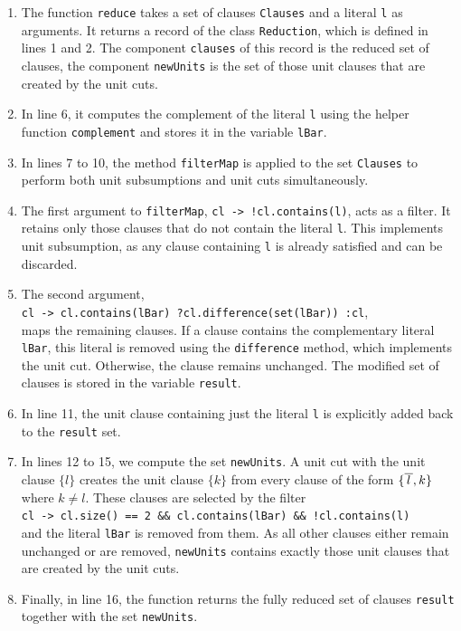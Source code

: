 \begin{enumerate}
\item The function \texttt{reduce} takes a set of clauses \texttt{Clauses} and a literal \texttt{l} as arguments.
  It returns a record of the class \texttt{Reduction}, which is defined in lines 1 and 2.  The component
  \texttt{clauses} of this record is the reduced set of clauses, the component \texttt{newUnits} is the set of
  those unit clauses that are created by the unit cuts.
\item In line 6, it computes the complement of the literal \texttt{l} using the helper function
  \texttt{complement} and stores it in the variable \texttt{lBar}.
\item In lines 7 to 10, the method \texttt{filterMap} is applied to the set \texttt{Clauses} to perform both
  unit subsumptions and unit cuts simultaneously.
\item The first argument to \texttt{filterMap}, \texttt{cl -> !cl.contains(l)}, acts as a filter. It retains only
  those clauses that do not contain the literal \texttt{l}. This implements unit subsumption, as any clause
  containing \texttt{l} is already satisfied and can be discarded. 
\item The second argument, 
  \\[0.2cm]
  \hspace*{1.3cm}
  \texttt{cl -> cl.contains(lBar) ?\;cl.difference(set(lBar)) :\;cl}, 
  \\[0.2cm]
  maps the remaining clauses. If a clause contains the complementary literal \texttt{lBar}, this literal is
  removed using the \texttt{difference} method, which implements the unit cut. Otherwise, the clause remains
  unchanged. The modified set of clauses is stored in the variable \texttt{result}. 
\item In line 11, the unit clause containing just the literal \texttt{l} is explicitly added back to the
  \texttt{result} set.
\item In lines 12 to 15, we compute the set \texttt{newUnits}.  A unit cut with the unit clause $\{l\}$ creates
  the unit clause $\{k\}$ from every clause of the form $\{\overline{\,l\,}, k\}$ where $k \not= l$.  These clauses
  are selected by the filter
  \\[0.2cm]
  \hspace*{1.3cm}
  \texttt{cl -> cl.size() == 2 \&\& cl.contains(lBar) \&\& !cl.contains(l)}
  \\[0.2cm]
  and the literal \texttt{lBar} is removed from them.  As all other clauses either remain unchanged or are
  removed, \texttt{newUnits} contains exactly those unit clauses that are created by the unit cuts.
\item Finally, in line 16, the function returns the fully reduced set of clauses \texttt{result} together with
  the set \texttt{newUnits}.
\end{enumerate}




